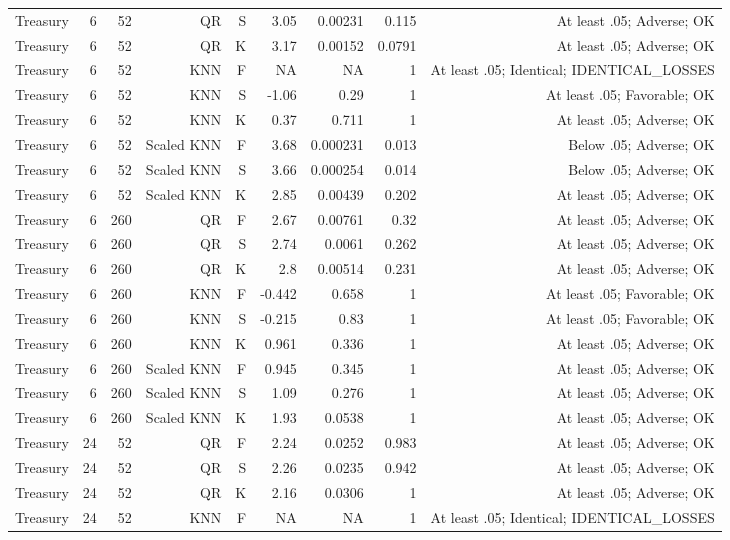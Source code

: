 \documentclass[10pt,a4paper]{article}
\begin{document}
\begin{center}
\begin{minipage}{\linewidth}
\begin{tabular}{lrrrrrrrr}
Treasury & 6 & 52 & QR & S & 3.05 & 0.00231 & 0.115 & At least .05; Adverse; OK \\
Treasury & 6 & 52 & QR & K & 3.17 & 0.00152 & 0.0791 & At least .05; Adverse; OK \\
Treasury & 6 & 52 & KNN & F & NA & NA & 1 & At least .05; Identical; IDENTICAL\_LOSSES \\
Treasury & 6 & 52 & KNN & S & -1.06 & 0.29 & 1 & At least .05; Favorable; OK \\
Treasury & 6 & 52 & KNN & K & 0.37 & 0.711 & 1 & At least .05; Adverse; OK \\
Treasury & 6 & 52 & Scaled KNN & F & 3.68 & 0.000231 & 0.013 & Below .05; Adverse; OK \\
Treasury & 6 & 52 & Scaled KNN & S & 3.66 & 0.000254 & 0.014 & Below .05; Adverse; OK \\
Treasury & 6 & 52 & Scaled KNN & K & 2.85 & 0.00439 & 0.202 & At least .05; Adverse; OK \\
Treasury & 6 & 260 & QR & F & 2.67 & 0.00761 & 0.32 & At least .05; Adverse; OK \\
Treasury & 6 & 260 & QR & S & 2.74 & 0.0061 & 0.262 & At least .05; Adverse; OK \\
Treasury & 6 & 260 & QR & K & 2.8 & 0.00514 & 0.231 & At least .05; Adverse; OK \\
Treasury & 6 & 260 & KNN & F & -0.442 & 0.658 & 1 & At least .05; Favorable; OK \\
Treasury & 6 & 260 & KNN & S & -0.215 & 0.83 & 1 & At least .05; Favorable; OK \\
Treasury & 6 & 260 & KNN & K & 0.961 & 0.336 & 1 & At least .05; Adverse; OK \\
Treasury & 6 & 260 & Scaled KNN & F & 0.945 & 0.345 & 1 & At least .05; Adverse; OK \\
Treasury & 6 & 260 & Scaled KNN & S & 1.09 & 0.276 & 1 & At least .05; Adverse; OK \\
Treasury & 6 & 260 & Scaled KNN & K & 1.93 & 0.0538 & 1 & At least .05; Adverse; OK \\
Treasury & 24 & 52 & QR & F & 2.24 & 0.0252 & 0.983 & At least .05; Adverse; OK \\
Treasury & 24 & 52 & QR & S & 2.26 & 0.0235 & 0.942 & At least .05; Adverse; OK \\
Treasury & 24 & 52 & QR & K & 2.16 & 0.0306 & 1 & At least .05; Adverse; OK \\
Treasury & 24 & 52 & KNN & F & NA & NA & 1 & At least .05; Identical; IDENTICAL\_LOSSES \\

\end{tabular}
\end{minipage}
\end{center}
\end{document}
